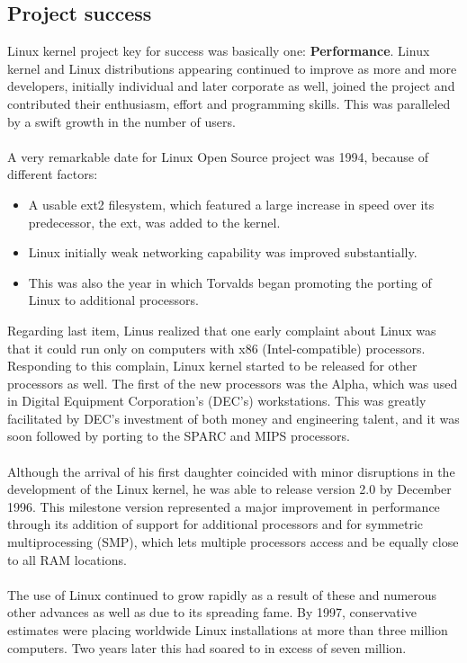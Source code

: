\documentclass[11pt]{article}
\begin{document}
\subsection{Project success}
Linux kernel project key for success was basically one: \textbf{Performance}. Linux kernel and Linux distributions appearing continued to improve as more and more developers, initially individual and later corporate as well, joined the project and contributed their enthusiasm, effort and programming skills. This was paralleled by a swift growth in the number of users.\\
\\
A very remarkable date for Linux Open Source project was 1994, because of different factors:
\begin{itemize}\itemsep0pt
\item{A usable ext2 filesystem, which featured a large increase in speed over its predecessor, the ext, was added to the kernel.}
\item{Linux initially weak networking capability was improved substantially.}
\item{This was also the year in which Torvalds began promoting the porting of Linux to additional processors.}
\end{itemize}
Regarding last item, Linus realized that one early complaint about Linux was that it could run only on computers with x86 (Intel-compatible) processors. Responding to this complain, Linux kernel started to be released for other processors as well. The first of the new processors was the Alpha, which was used in Digital Equipment Corporation's (DEC's) workstations. This was greatly facilitated by DEC's investment of both money and engineering talent, and it was soon followed by porting to the SPARC and MIPS processors.\\
\\
Although the arrival of his first daughter coincided with minor disruptions in the development of the Linux kernel, he was able to release version 2.0 by December 1996. This milestone version represented a major improvement in performance through its addition of support for additional processors and for symmetric multiprocessing (SMP), which lets multiple processors access and be equally close to all RAM locations.\\
\\
The use of Linux continued to grow rapidly as a result of these and numerous other advances as well as due to its spreading fame. By 1997, conservative estimates were placing worldwide Linux installations at more than three million computers. Two years later this had soared to in excess of seven million.\\
\end{document}
